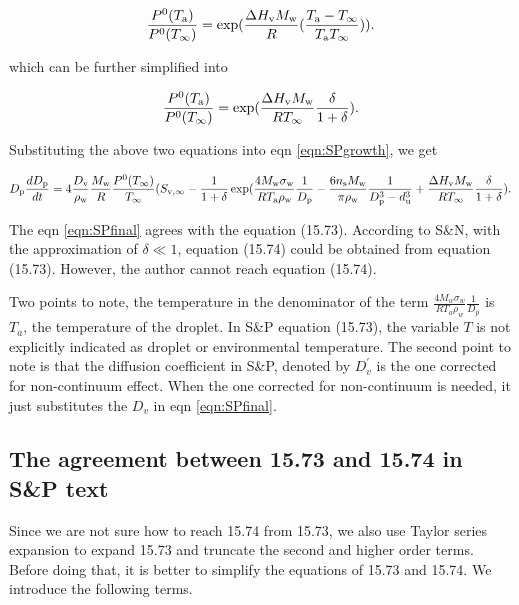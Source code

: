 \documentclass[12pt]{article}
\begin{document}
\begin{equation}\label{eqn:15}
\frac{P^{\rm 0}(T_{\rm a})}{P^{\rm 0}(T_{\infty})}=\exp (\frac{\Delta H_{\rm v} M_{\rm w}}{R} (\frac{T_{\rm a}-T_{\infty}}{T_{\rm a} T_{\infty}})).
\end{equation}

which can be further simplified into 

\begin{equation}\label{eqn:CC}
\frac{P^{\rm 0}(T_{\rm a})}{P^{\rm 0}(T_{\infty})}=\exp (\frac{\Delta H_{\rm v} M_{\rm w}}{R T_{\infty}} \frac{\delta}{1+\delta}).
\end{equation}

Substituting the above two equations into eqn \ref{eqn:SPgrowth}, we get

\begin{equation}\label{eqn:SPfinal}
D_{\rm p}\frac{dD_{\rm p}}{dt}=4 \frac{D_{\rm v}} {\rho_{\rm w}} \frac{M_{\rm w}}{R} \frac{P^{\rm 0}(T_{\infty})} {T_{\infty}} (S_{\rm v, \infty} - \frac{1}{1+\delta} \exp(\frac{4 M_{\rm w}\sigma_{\rm w}}{R T_{\rm a} \rho_{\rm w}}\frac{1}{D_{\rm p}}-\frac{6 n_{\rm s} M_{\rm w}}{\pi \rho_{\rm w}} \frac{1}{D_{\rm p}^{3}-d_{\rm u}^{3}}+\frac{\Delta H_{\rm v} M_{\rm w}}{R T_{\infty}} \frac{\delta}{1+\delta}).
\end{equation}

The eqn \ref{eqn:SPfinal} agrees with the equation (15.73). According to S\&N, with the approximation of $\delta \ll 1$, equation (15.74) could be obtained from equation (15.73).  However, the author cannot reach equation (15.74).

Two points to note, the temperature in the denominator of the term  $\frac{4 M_{w}\sigma_{w}}{R T_{a} \rho_w}\frac{1}{D_{p}}$ is $T_{a}$, the temperature of the droplet. In S\&P equation (15.73), the variable $T$ is not explicitly indicated as droplet or environmental temperature. The second point to note is that the diffusion coefficient in S\&P, denoted by $D_{v}^{'}$  is the one corrected for non-continuum effect. When the one corrected for non-continuum is needed, it just substitutes the $D_{v}$ in eqn \ref{eqn:SPfinal}.

\subsection{The agreement between 15.73 and 15.74 in S\&P text}

Since we are not sure how to reach 15.74 from 15.73, we also use Taylor series expansion to expand 15.73 and truncate the second and higher order terms. Before doing that, it is better to simplify the equations of 15.73 and 15.74. We introduce the following terms.
\end{document}
